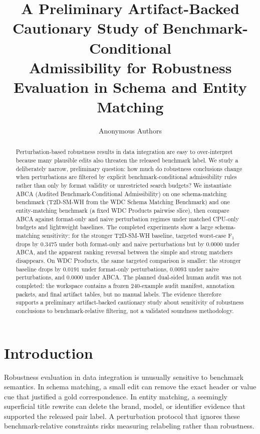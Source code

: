 \documentclass{article}
\title{A Preliminary Artifact-Backed Cautionary Study of Benchmark-Conditional\\Admissibility for Robustness Evaluation in Schema and Entity Matching}
\author{Anonymous Authors}
\newcommand{\abca}{\textsc{ABCA}}
\newcommand{\fonescore}{\ensuremath{\mathrm{F}_{1}}}
\begin{document}
\maketitle

\begin{abstract}
Perturbation-based robustness results in data integration are easy to over-interpret because many plausible edits also threaten the released benchmark label. We study a deliberately narrow, preliminary question: how much do robustness conclusions change when perturbations are filtered by explicit benchmark-conditional admissibility rules rather than only by format validity or unrestricted search budgets? We instantiate \abca{} (Audited Benchmark-Conditional Admissibility) on one schema-matching benchmark (T2D-SM-WH from the WDC Schema Matching Benchmark) and one entity-matching benchmark (a fixed WDC Products pairwise slice), then compare \abca{} against format-only and naive perturbation regimes under matched CPU-only budgets and lightweight baselines. The completed experiments show a large schema-matching sensitivity: for the stronger T2D-SM-WH baseline, targeted worst-case \fonescore{} drops by $0.3475$ under both format-only and naive perturbations but by $0.0000$ under \abca{}, and the apparent ranking reversal between the simple and strong matchers disappears. On WDC Products, the same targeted comparison is smaller: the stronger baseline drops by $0.0191$ under format-only perturbations, $0.0093$ under naive perturbations, and $0.0000$ under \abca{}. The planned dual-sided human audit was not completed: the workspace contains a frozen 240-example audit manifest, annotation packets, and final artifact tables, but no manual labels. The evidence therefore supports a preliminary artifact-backed cautionary study about sensitivity of robustness conclusions to benchmark-relative filtering, not a validated soundness methodology.
\end{abstract}

\section{Introduction}
Robustness evaluation in data integration is unusually sensitive to benchmark semantics. In schema matching, a small edit can remove the exact header or value cue that justified a gold correspondence. In entity matching, a seemingly superficial title rewrite can delete the brand, model, or identifier evidence that supported the released pair label. A perturbation protocol that ignores these benchmark-relative constraints risks measuring relabeling rather than robustness.
\end{document}
